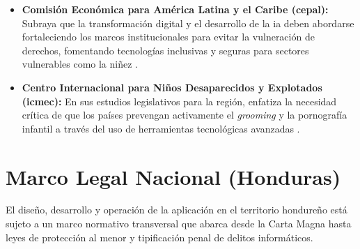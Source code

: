 \begin{itemize}
    \item \textbf{Comisión Económica para América Latina y el Caribe (\gls{cepal}):} Subraya que la transformación digital y el desarrollo de la \gls{ia} deben abordarse fortaleciendo los marcos institucionales para evitar la vulneración de derechos, fomentando tecnologías inclusivas y seguras para sectores vulnerables como la niñez \cite{cepal_ia_2021}.
    \item \textbf{Centro Internacional para Niños Desaparecidos y Explotados (\gls{icmec}):} En sus estudios legislativos para la región, enfatiza la necesidad crítica de que los países prevengan activamente el \textit{grooming} y la pornografía infantil a través del uso de herramientas tecnológicas avanzadas \cite{icmec_unicef_2020}.
\end{itemize} 

\section{Marco Legal Nacional (Honduras)}
El diseño, desarrollo y operación de la aplicación en el territorio hondureño está sujeto a un marco normativo transversal que abarca desde la Carta Magna hasta leyes de protección al menor y tipificación penal de delitos informáticos.

